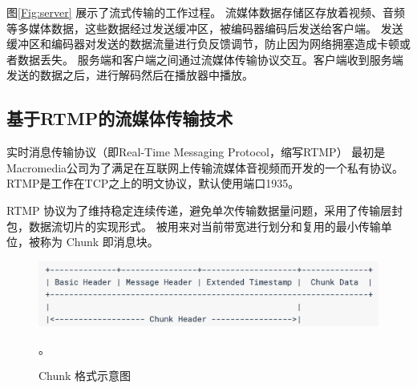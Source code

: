图\ref{Fig:server} 展示了流式传输的工作过程。
流媒体数据存储区存放着视频、音频等多媒体数据，这些数据经过发送缓冲区，被编码器编码后发送给客户端。
发送缓冲区和编码器对发送的数据流量进行负反馈调节，防止因为网络拥塞造成卡顿或者数据丢失。
服务端和客户端之间通过流媒体传输协议交互。客户端收到服务端发送的数据之后，进行解码然后在播放器中播放。


\subsection{基于RTMP的流媒体传输技术}



实时消息传输协议（即Real-Time Messaging Protocol，缩写RTMP） 最初是Macromedia公司为了满足在互联网上传输流媒体音视频而开发的一个私有协议。
RTMP是工作在TCP之上的明文协议，默认使用端口1935。

RTMP 协议为了维持稳定连续传递，避免单次传输数据量问题，采用了传输层封包，数据流切片的实现形式。
被用来对当前带宽进行划分和复用的最小传输单位，被称为 Chunk 即消息块。

\begin{figure}[ht]
    \centering
    \includegraphics[scale=.4]{./Figure/IMG_chunk.png}
    \caption{Chunk 格式示意图}。
    \label{Fig:chunk}
\end{figure}

